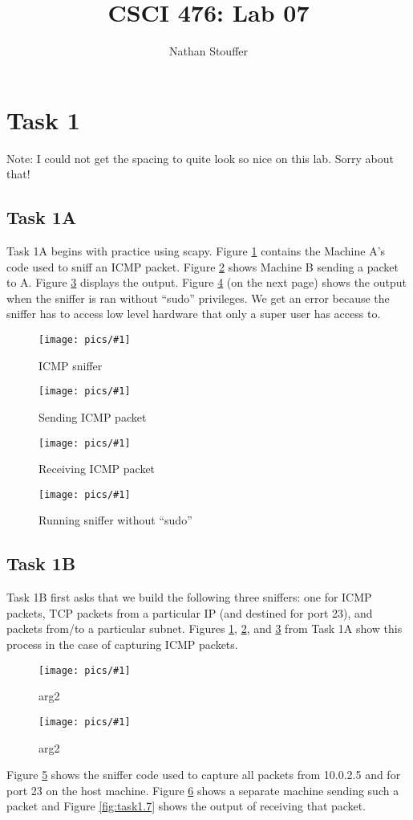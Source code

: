 \documentclass[11pt]{article}
\newcommand{\fig}[2]{ 
\begin{figure}[h]
	\centering
	\caption{#2}
	\texttt{[image: pics/\#1]}
	\label{fig:#1}
\end{figure} 
}
\begin{document}
\title{CSCI 476: Lab 07}
\author{Nathan Stouffer}
\maketitle
\newpage

\section*{Task 1}

Note: I could not get the spacing to quite look so nice on this lab. Sorry about that!

\subsection*{Task 1A}

Task 1A begins with practice using scapy. Figure \ref{fig:task1.1} contains the Machine A's code used to sniff an ICMP packet. Figure \ref{fig:task1.2} shows Machine B sending a packet to A. Figure \ref{fig:task1.3} displays the output. Figure \ref{fig:task1.4} (on the next page) shows the output when the sniffer is ran without ``sudo'' privileges. We get an error because the sniffer has to access low level hardware that only a super user has access to.

\fig{task1.1}{ICMP sniffer}

\fig{task1.2}{Sending ICMP packet}

\fig{task1.3}{Receiving ICMP packet}

\fig{task1.4}{Running sniffer without ``sudo''}

\newpage
\subsection*{Task 1B}

Task 1B first asks that we build the following three sniffers: one for ICMP packets, TCP packets from a particular IP (and destined for port 23), and packets from/to a particular subnet. Figures \ref{fig:task1.1}, \ref{fig:task1.2}, and \ref{fig:task1.3} from Task 1A show this process in the case of capturing ICMP packets.

\fig{task1.5}{arg2}

\fig{task1.6}{arg2}

Figure \ref{fig:task1.5} shows the sniffer code used to capture all packets from 10.0.2.5 and for port 23 on the host machine. Figure \ref{fig:task1.6} shows a separate machine sending such a packet and Figure \ref{fig:task1.7} shows the output of receiving that packet.
\end{document}
